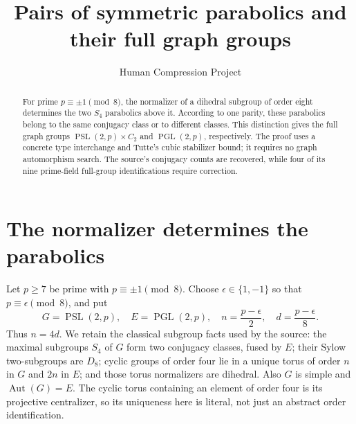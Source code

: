 \documentclass[11pt]{article}
\title{Pairs of symmetric parabolics and their full graph groups}
\author{Human Compression Project}\date{}
\newcommand{\PSL}{\operatorname{PSL}}
\newcommand{\PGL}{\operatorname{PGL}}
\newcommand{\Aut}{\operatorname{Aut}}
\begin{document}
\maketitle
\begin{abstract}
For prime $p\equiv\pm1\pmod8$, the normalizer of a dihedral subgroup
of order eight determines the two $S_4$ parabolics above it. According
to one parity, these parabolics belong to the same conjugacy class or
to different classes. This distinction gives the full graph groups
$\PSL(2,p)\times C_2$ and $\PGL(2,p)$, respectively. The proof uses
a concrete type interchange and Tutte's cubic stabilizer bound; it
requires no graph automorphism search. The source's conjugacy counts
are recovered, while four of its nine prime-field full-group
identifications require correction.
\end{abstract}

\section{The normalizer determines the parabolics}
Let $p\ge7$ be prime with $p\equiv\pm1\pmod8$. Choose
$\epsilon\in\{1,-1\}$ so that $p\equiv\epsilon\pmod8$, and put
\[
 G=\PSL(2,p),\quad E=\PGL(2,p),\quad
 n=\frac{p-\epsilon}{2},\quad d=\frac{p-\epsilon}{8}.
\]
Thus $n=4d$. We retain the classical subgroup facts used by the source:
the maximal subgroups $S_4$ of $G$ form two conjugacy classes, fused
by $E$; their Sylow two-subgroups are $D_8$; cyclic groups of order
four lie in a unique torus of order $n$ in $G$ and $2n$ in $E$;
and those torus normalizers are dihedral. Also $G$ is simple and
$\Aut(G)=E$. The cyclic torus containing an element of order four
is its projective centralizer, so its uniqueness here is literal,
not just an abstract order identification.
\end{document}
